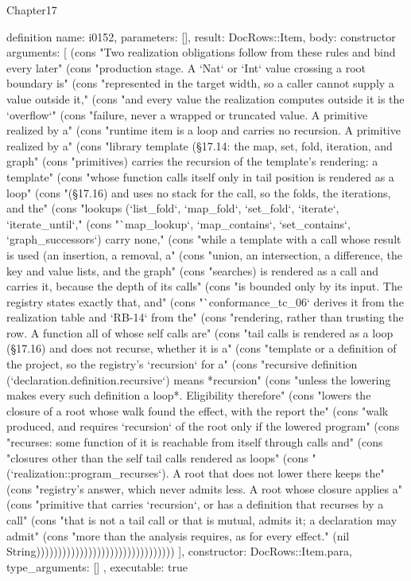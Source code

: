 \begin{lexlean}{Chapter17}
\begin{semanticmodule}
definition{
  name: i0152,
  parameters: [],
  result: DocRows::Item,
  body: constructor{
    arguments: [
      (cons "Two realization obligations follow from these rules and bind every later" (cons "production stage. A `Nat` or `Int` value crossing a root boundary is" (cons "represented in the target width, so a caller cannot supply a value outside it," (cons "and every value the realization computes outside it is the `overflow`" (cons "failure, never a wrapped or truncated value. A primitive realized by a" (cons "runtime item is a loop and carries no recursion. A primitive realized by a" (cons "library template (§17.14: the map, set, fold, iteration, and graph" (cons "primitives) carries the recursion of the template's rendering: a template" (cons "whose function calls itself only in tail position is rendered as a loop" (cons "(§17.16) and uses no stack for the call, so the folds, the iterations, and the" (cons "lookups (`list_fold`, `map_fold`, `set_fold`, `iterate`, `iterate_until`," (cons "`map_lookup`, `map_contains`, `set_contains`, `graph_successors`) carry none," (cons "while a template with a call whose result is used (an insertion, a removal, a" (cons "union, an intersection, a difference, the key and value lists, and the graph" (cons "searches) is rendered as a call and carries it, because the depth of its calls" (cons "is bounded only by its input. The registry states exactly that, and" (cons "`conformance_tc_06` derives it from the realization table and `RB-14` from the" (cons "rendering, rather than trusting the row. A function all of whose self calls are" (cons "tail calls is rendered as a loop (§17.16) and does not recurse, whether it is a" (cons "template or a definition of the project, so the registry's `recursion` for a" (cons "recursive definition (`declaration.definition.recursive`) means *recursion" (cons "unless the lowering makes every such definition a loop*. Eligibility therefore" (cons "lowers the closure of a root whose walk found the effect, with the report the" (cons "walk produced, and requires `recursion` of the root only if the lowered program" (cons "recurses: some function of it is reachable from itself through calls and" (cons "closures other than the self tail calls rendered as loops" (cons "(`realization::program_recurses`). A root that does not lower there keeps the" (cons "registry's answer, which never admits less. A root whose closure applies a" (cons "primitive that carries `recursion`, or has a definition that recurses by a call" (cons "that is not a tail call or that is mutual, admits it; a declaration may admit" (cons "more than the analysis requires, as for every effect." (nil String))))))))))))))))))))))))))))))))
    ],
    constructor: DocRows::Item.para,
    type_arguments: []
  },
  executable: true
}


\end{semanticmodule}
\end{lexlean}
